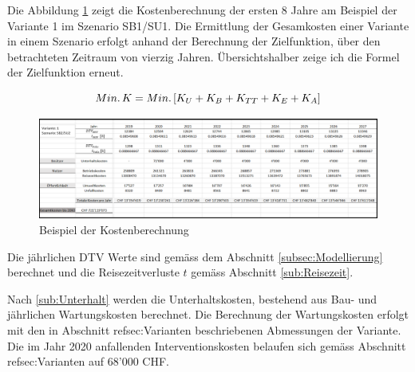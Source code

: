 %
%
%
%


Die Abbildung \ref{img:Kostenberechnung} zeigt die Kostenberechnung der ersten 8 Jahre am Beispiel der Variante 1 im Szenario SB1/SU1. 
Die Ermittlung der Gesamkosten einer Variante in einem Szenario erfolgt anhand der Berechnung der Zielfunktion, über den betrachteten Zeitraum von vierzig Jahren. Übersichtshalber zeige ich die Formel der Zielfunktion erneut.

\begin{equation*}
Min. \thinspace K = Min. \thinspace [K_{U} + K_{B} + K_{TT} + K_{E} + K_{A}]
\end{equation*} 

\begin{figure}[h!]
	\centering
	\includegraphics[width=\textwidth]{figures/f-04-06-04-Kostenberechnung}
	\caption[Kostenberechnung]{Beispiel der Kostenberechnung}
	\label{img:Kostenberechnung}
\end{figure}

Die jährlichen DTV Werte sind gemäss dem Abschnitt \ref{subsec:Modellierung} berechnet und die Reisezeitverluste $t$ gemäss Abschnitt \ref{sub:Reisezeit}. 

Nach \ref{sub:Unterhalt} werden die Unterhaltskosten, bestehend aus Bau- und jährlichen Wartungskosten berechnet. Die Berechnung der Wartungskosten erfolgt mit den in Abschnitt ref{sec:Varianten} beschriebenen Abmessungen der Variante. Die im Jahr 2020 anfallenden Interventionskosten belaufen sich gemäss Abschnitt ref{sec:Varianten} auf 68'000 CHF.

